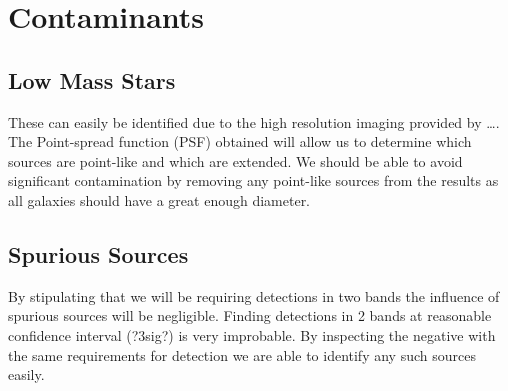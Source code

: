 
\section{Contaminants} %
\label{sec:contaminants}
    \subsection{Low Mass Stars} %
    \label{sub:low_mass_stars}
        These can easily be identified due to the high resolution imaging provided by \ldots. The Point-spread function (PSF) obtained will allow us to determine which sources are point-like and which are extended. We should be able to avoid significant contamination by removing any point-like sources from the results as all galaxies should have a great enough diameter.

    \subsection{Spurious Sources} %
    \label{sub:spurious_sources}
        By stipulating that we will be requiring detections in two bands the influence of spurious sources will be negligible. Finding detections in 2 bands at reasonable confidence interval (?3sig?) is very improbable. By inspecting the negative with the same requirements for detection we are able to identify any such sources easily\cite{Bouwens2011}.

